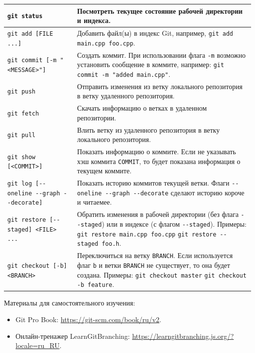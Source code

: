 \documentclass[14pt]{extarticle}
\begin{document}
\begin{landscape}
\begin{xltabular}{\linewidth}{|X|X|}
        \verb|git status| &
        Посмотреть текущее состояние рабочей директории и индекса. \\
        \hline
        \verb|git add [FILE ...]| &
        Добавить файл(ы) в индекс Git, например, \verb|git add main.cpp foo.cpp|. \\
        \hline
        \verb|git commit [-m "<MESSAGE>"]| &
        Создать коммит. При использовании флага \verb|-m| возможно установить
        сообщение в коммите, например: \hfill \break
        \verb|git commit -m "added main.cpp"|. \\
        \hline
        \verb|git push| &
        Отправить изменения из ветку локального репозитория в ветку
        удаленного репозитория. \\
        \hline
        \verb|git fetch| &
        Скачать информацию о ветках в удаленном репозитории. \\
        \hline
        \verb|git pull| &
        Влить ветку из удаленного репозитория в ветку
        локального репозитория. \\
        \hline
        \verb|git show [<COMMIT>]| &
        Показать информацию о коммите.
        Если не указывать хэш коммита \verb|COMMIT|, то будет показана
        информация о текущем коммите. \\
        \hline
        \verb|git log [--oneline --graph --decorate]| &
        Показать историю коммитов текущей ветки.
        Флаги \verb|--oneline --graph --decorate| сделают историю короче
        и читаемее. \\
        \hline
        \verb|git restore [--staged] <FILE> ...| &
        Обратить изменения в рабочей директории (без флага \verb|--staged|)
        или в индексе (с флагом \verb|--staged|).
        Примеры: \hfill \break
        \verb|git restore main.cpp foo.cpp| \hfill \break
        \verb|git restore --staged foo.h|. \\
        \hline
        \verb|git checkout [-b] <BRANCH>| &
        Переключиться на ветку \verb|BRANCH|.
        Если используется флаг \verb|b| и ветки \verb|BRANCH| не существует,
        то она будет создана.
        Примеры: \hfill \break
        \verb|git checkout master| \hfill \break
        \verb|git checkout -b feature|. \\

    \end{xltabular}

    Материалы для самостоятельного изучения:

    \begin{itemize}

        \item Git Pro Book:
            \url{https://git-scm.com/book/ru/v2}.

        \item Онлайн-тренажер LearnGitBranching:
            \url{https://learngitbranching.js.org/?locale=ru\_RU}.
    \end{itemize}

\end{landscape}
\end{document}
